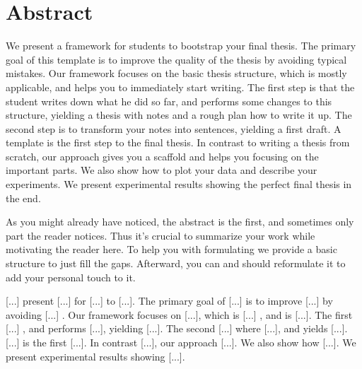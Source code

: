 \chapter{Abstract}

We present a framework for students to bootstrap your final thesis. The primary goal of this template is to improve the quality of the thesis by avoiding typical mistakes. Our framework focuses on the basic thesis structure, which is mostly applicable, and helps you to immediately start writing. The first step is that the student writes down what he did so far, and performs some changes to this structure, yielding a thesis with notes and a rough plan how to write it up. The second step is to transform your notes into sentences, yielding a first draft. A template is the first step to the final thesis. In contrast to writing a thesis from scratch, our approach gives you a scaffold and helps you focusing on the important parts. We also show how to plot your data and describe your experiments. We present experimental results showing the perfect final thesis in the end.

As you might already have noticed, the abstract is the first, and sometimes only part the reader notices.
Thus it's crucial to summarize your work while motivating the reader here.
To help you with formulating we provide a basic structure to just fill the gaps.
Afterward, you can and should reformulate it to add your personal touch to it.

    [...] present [...] for [...] to [...]. The primary goal of [...] is to improve [...] by avoiding [...] . Our framework focuses on [...], which is [...] , and is [...]. The first [...] , and performs [...], yielding [...]. The second [...] where [...], and yields [...]. [...] is the first [...]. In contrast [...], our approach [...]. We also show how [...]. We present experimental results showing [...].